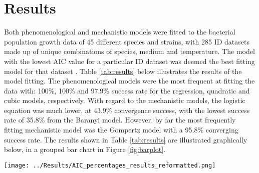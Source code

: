 \documentclass[11pt, a4paper]{article} %
\begin{document}
\section{Results}

Both phenomenological and mechanistic models were fitted to the bacterial population growth data of 45 different species and strains, with 285 ID datasets made up of unique combinations of species, medium and temperature. The model with the lowest AIC value for a particular ID dataset was deemed the best fitting model for that dataset \citep{RN112}. Table \ref{tab:results} below illustrates the results of the model fitting. The phenomenological models were the most frequent at fitting the data with: 100\%, 100\% and 97.9\% success rate for the regression, quadratic and cubic models, respectively. With regard to the mechanistic models, the logistic equation was much lower, at 43.9\% convergence success, with the lowest success rate of 35.8\% from the Baranyi model. However, by far the most frequently fitting mechanistic model was the Gompertz model with a 95.8\% converging success rate. The results shown in Table \ref{tab:results} are illustrated graphically below, in a grouped bar chart in Figure \ref{fig:barplot}.

\begin{table}
\caption{\textbf{A)} The percentage for which the model is the best fitting model across all dataset IDs. \textbf{B)} The percentage for which the model fits all dataset IDs. \textbf{C)} Of the dataset IDs the model fits (B), the percentage for which it fits the dataset IDs the best.}
\label{tab:results}
\end{table}

\begin{SCfigure} %
\centering
\texttt{[image: ../Results/AIC\_percentages\_results\_reformatted.png]}
\caption{\textbf{A)} The percentage for which the model is the best fitting model across all dataset IDs. \textbf{B)} The percentage for which the model fits all dataset IDs. \textbf{C)} Of the dataset IDs the model fits (B), the percentage for which it fits the dataset IDs the best.}
\label{fig:barplot}
\end{SCfigure}
\end{document}
